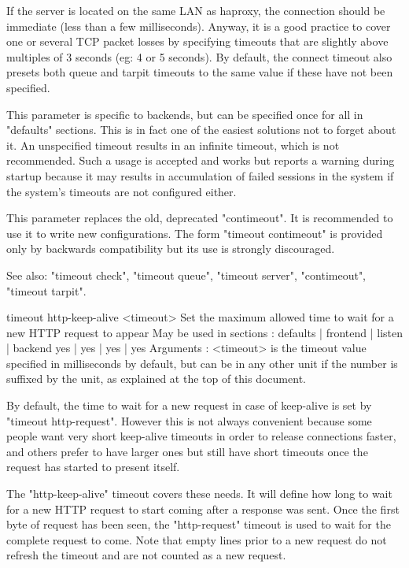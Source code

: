   If the server is located on the same LAN as haproxy, the connection should be
  immediate (less than a few milliseconds). Anyway, it is a good practice to
  cover one or several TCP packet losses by specifying timeouts that are
  slightly above multiples of 3 seconds (eg: 4 or 5 seconds). By default, the
  connect timeout also presets both queue and tarpit timeouts to the same value
  if these have not been specified.

  This parameter is specific to backends, but can be specified once for all in
  "defaults" sections. This is in fact one of the easiest solutions not to
  forget about it. An unspecified timeout results in an infinite timeout, which
  is not recommended. Such a usage is accepted and works but reports a warning
  during startup because it may results in accumulation of failed sessions in
  the system if the system's timeouts are not configured either.

  This parameter replaces the old, deprecated "contimeout". It is recommended
  to use it to write new configurations. The form "timeout contimeout" is
  provided only by backwards compatibility but its use is strongly discouraged.

  See also: "timeout check", "timeout queue", "timeout server", "contimeout",
            "timeout tarpit".


timeout http-keep-alive <timeout>
  Set the maximum allowed time to wait for a new HTTP request to appear
  May be used in sections :   defaults | frontend | listen | backend
                                 yes   |    yes   |   yes  |   yes
  Arguments :
    <timeout> is the timeout value specified in milliseconds by default, but
              can be in any other unit if the number is suffixed by the unit,
              as explained at the top of this document.

  By default, the time to wait for a new request in case of keep-alive is set
  by "timeout http-request". However this is not always convenient because some
  people want very short keep-alive timeouts in order to release connections
  faster, and others prefer to have larger ones but still have short timeouts
  once the request has started to present itself.

  The "http-keep-alive" timeout covers these needs. It will define how long to
  wait for a new HTTP request to start coming after a response was sent. Once
  the first byte of request has been seen, the "http-request" timeout is used
  to wait for the complete request to come. Note that empty lines prior to a
  new request do not refresh the timeout and are not counted as a new request.

